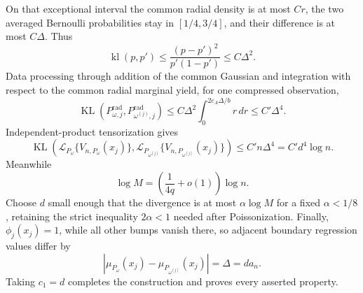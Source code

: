 On that exceptional interval the common radial density is at most \(Cr\), the two averaged Bernoulli probabilities stay in \([1/4,3/4]\), and their difference is at most \(C\Delta\).  Thus
\[
 \operatorname{kl}(p,p')
 \leq\frac{(p-p')^2}{p'(1-p')}
 \leq C\Delta^2.
\]
Data processing through addition of the common Gaussian and integration with respect to the common radial marginal yield, for one compressed observation,
\[
 \operatorname{KL}(P^{\mathrm{rad}}_{\omega,j},P^{\mathrm{rad}}_{\omega^{(j)},j})
 \leq C\Delta^2\int_0^{2c_A\Delta/b}r\,dr
 \leq C'\Delta^4.
\]
Independent-product tensorization gives
\[
 \operatorname{KL}\!\left(
 \mathcal L_{P_\omega}\{V_{n,P_\omega}(x_j)\},
 \mathcal L_{P_{\omega^{(j)}}}\{V_{n,P_{\omega^{(j)}}}(x_j)\}
 \right)
 \leq C'n\Delta^4=C'd^4\log n.
\]
Meanwhile
\[
 \log M=\left(\frac1{4q}+o(1)\right)\log n.
\]
Choose \(d\) small enough that the divergence is at most \(\alpha\log M\) for a fixed \(\alpha<1/8\), retaining the strict inequality \(2\alpha<1\) needed after Poissonization.  Finally, \(\phi_j(x_j)=1\), while all other bumps vanish there, so adjacent boundary regression values differ by
\[
 |\mu_{P_\omega}(x_j)-\mu_{P_{\omega^{(j)}}}(x_j)|=\Delta=d a_n.
\]
Taking \(c_1=d\) completes the construction and proves every asserted property.